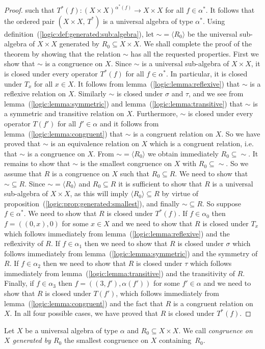 \begin{proof}
such that $T^{*}(f):(X\times X)^{\alpha^{*}(f)}\to X\times X$ for
all $f\in\alpha^{*}$. It follows that the ordered pair $(X\times
X,\,T^{*})$ is a universal algebra of type $\alpha^{*}$. Using
definition~(\ref{logic:def:generated:sub:algebra}), let
$\sim=\langle R_{0}\rangle$ be the universal sub-algebra of $X\times
X$ generated by $R_{0}\subseteq X\times X$. We shall complete the
proof of the theorem by showing that the relation $\sim$ has all the
requested properties. First we show that $\sim$ is a congruence on
$X$. Since $\sim$ is a universal sub-algebra of $X\times X$, it is
closed under every operator $T^{*}(f)$ for all $f\in\alpha^{*}$. In
particular, it is closed under $T_{x}$ for all $x\in X$. It follows
from lemma~(\ref{logic:lemma:reflexive}) that $\sim$ is a reflexive
relation on $X$. Similarly $\sim$ is closed under $\sigma$ and
$\tau$, and we see from lemma~(\ref{logic:lemma:symmetric}) and
lemma~(\ref{logic:lemma:transitive}) that $\sim$ is a symmetric and
transitive relation on $X$. Furthermore, $\sim$ is closed under
every operator $T(f')$ for all $f'\in\alpha$ and it follows from
lemma~(\ref{logic:lemma:congruent}) that $\sim$ is a congruent
relation on $X$. So we have proved that $\sim$ is an equivalence
relation on $X$ which is a congruent relation, i.e. that $\sim$ is a
congruence on $X$. From $\sim=\langle R_{0}\rangle$ we obtain
immediately $R_{0}\subseteq\sim$. It remains to show that $\sim$ is
the smallest congruence on $X$ with $R_{0}\subseteq\sim$. So we
assume that $R$ is a congruence on $X$ such that $R_{0}\subseteq R$.
We need to show that $\sim\subseteq R$. Since $\sim=\langle
R_{0}\rangle$ and $R_{0}\subseteq R$ it is sufficient to show that
$R$ is a universal sub-algebra of $X\times X$, as this will imply
$\langle R_{0}\rangle\subseteq R$ by virtue of
proposition~(\ref{logic:prop:generated:smallest}), and finally
$\sim\subseteq R$. So suppose $f\in\alpha^{*}$. We need to show that
$R$ is closed under $T^{*}(f)$. If $f\in\alpha_{0}$ then
$f=((0,x),0)$ for some $x\in X$ and we need to show that $R$ is
closed under $T_{x}$ which follows immediately from
lemma~(\ref{logic:lemma:reflexive}) and the reflexivity of $R$. If
$f\in\alpha_{1}$ then we need to show that $R$ is closed under
$\sigma$ which follows immediately from
lemma~(\ref{logic:lemma:symmetric}) and the symmetry of $R$. If
$f\in\alpha_{2}$ then we need to show that $R$ is closed under
$\tau$ which follows immediately from
lemma~(\ref{logic:lemma:transitive}) and the transitivity of $R$.
Finally, if $f\in\alpha_{3}$ then $f=((3,f'),\alpha(f'))$ for some
$f'\in\alpha$ and we need to show that $R$ is closed under $T(f')$,
which follows immediately from lemma~(\ref{logic:lemma:congruent})
and the fact that $R$ is a congruent relation on $X$. In all four
possible cases, we have proved that $R$ is closed under $T^{*}(f)$.
\end{proof}
\begin{defin}\label{logic:def:generated:congruence}
Let $X$ be a universal algebra of type $\alpha$ and $R_{0}\subseteq
X\times X$. We call {\em congruence on $X$ generated by $R_{0}$} the
smallest congruence on $X$ containing~$R_{0}$.
\end{defin}

